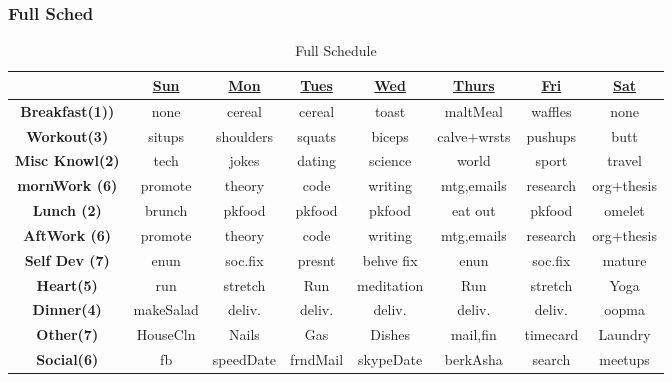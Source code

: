 \begin{frame}
\frametitle{Full Sched}
\begin{table}[h!]
  \begin{center}
    \small
    \begin{tabular}{ | c || c | c | c | c | c | c | c |}
      \hline
      & \underline{Sun} & \underline{Mon} & \underline{Tues} & \underline{Wed} & \underline{Thurs} & \underline{Fri} & \underline{Sat} \\
      \hline
      \tiny \textbf{Breakfast(1))}  &  \tiny none & \tiny cereal & \tiny cereal & \tiny toast  & \tiny maltMeal  & \tiny waffles & \tiny none \\
      \hline
      \tiny \textbf{Workout(3)} & \tiny situps & \tiny shoulders  & \tiny squats  & \tiny biceps  & \tiny calve+wrsts  & \tiny pushups  & \tiny butt \\
      \hline
      \tiny \textbf{Misc Knowl(2)} & \tiny tech  & \tiny jokes & \tiny dating & \tiny science  & \tiny world & \tiny sport & \tiny travel \\
      \hline
      \tiny \textbf{mornWork (6)} & \tiny promote  & \tiny theory & \tiny code & \tiny writing  & \tiny mtg,emails & \tiny research  & \tiny org+thesis \\
      \hline
      \tiny \textbf{Lunch (2)}  &  \tiny brunch & \tiny pkfood & \tiny pkfood & \tiny pkfood  & \tiny eat out & \tiny pkfood  & \tiny omelet \\
      \hline
      \tiny \textbf{AftWork (6)} & \tiny promote  & \tiny theory & \tiny code & \tiny writing  & \tiny mtg,emails & \tiny research  & \tiny org+thesis \\
      \hline
      \tiny \textbf{Self Dev (7)} & \tiny enun & \tiny soc.fix  & \tiny presnt & \tiny behve fix & \tiny enun  & \tiny soc.fix & \tiny mature \\
      \hline
      \tiny \textbf{Heart(5)} & \tiny run  & \tiny stretch  & \tiny Run & \tiny meditation  & \tiny Run & \tiny stretch  & \tiny Yoga \\
      \hline
      \tiny \textbf{Dinner(4)}  & \tiny makeSalad & \tiny deliv. & \tiny deliv. & \tiny deliv.  & \tiny deliv.  & \tiny deliv. & \tiny oopma \\
      \hline
      \tiny \textbf{Other(7)} & \tiny HouseCln & \tiny Nails  & \tiny Gas & \tiny Dishes & \tiny mail,fin & \tiny timecard & \tiny Laundry \\
      \hline
      \tiny \textbf{Social(6)} & \tiny fb & \tiny speedDate & \tiny frndMail & \tiny skypeDate  & \tiny berkAsha & \tiny search  & \tiny meetups \\
      \hline
    \end{tabular}
  \end{center}
  \caption{Full Schedule}
\end{table}
\end{frame}

